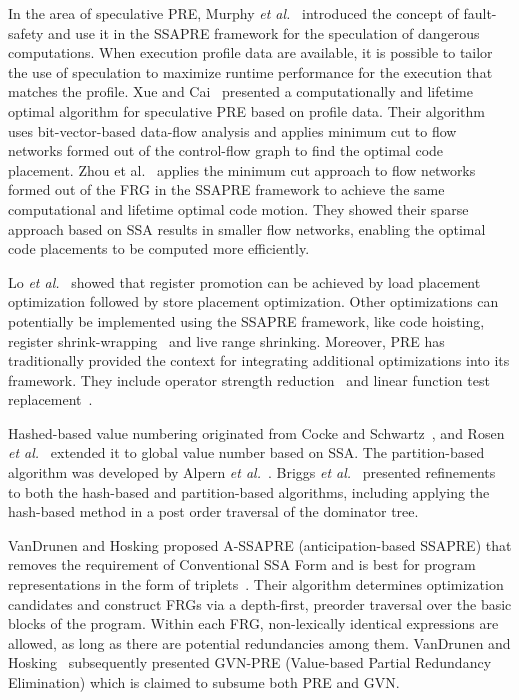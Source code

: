In the area of speculative PRE, Murphy {\it et al.}~\cite{Murphy08} introduced the concept of fault-safety and use it in the SSAPRE framework for the speculation of dangerous computations. 
When execution profile data are available, it is possible to tailor the use of speculation to maximize runtime performance for the execution that matches the profile. 
Xue and Cai~\cite{Xue06} presented a computationally and lifetime optimal algorithm for speculative PRE based on profile data. 
Their algorithm uses bit-vector-based data-flow analysis and applies minimum cut to flow networks formed out of the control-flow graph to find the optimal code placement. 
Zhou {et al.}~\cite{zhou11} applies the minimum cut approach to flow networks formed out of the FRG in the SSAPRE framework to achieve the same computational and lifetime optimal code motion. 
They showed their sparse approach based on SSA results in smaller flow networks, enabling the optimal code placements to be computed more efficiently.

Lo {\it et al.}~\cite{Lo98} showed that register promotion can be achieved by load placement optimization followed by store placement optimization. 
Other optimizations can potentially be implemented using the SSAPRE framework, like code hoisting, register shrink-wrap\-ping~\cite{Chow88} and live range shrinking. 
Moreover, PRE has traditionally provided the context for integrating additional optimizations into its framework. 
They include operator strength reduction~\cite{Knoop93} and linear function test replacement~\cite{Kennedy98}.

Hashed-based value numbering originated from Cocke and Schwartz~\cite{CS70}, and Rosen {\it et al.}~\cite{Rosen88} extended it to global value number based on SSA. 
The partition-based algorithm was developed by Alpern {\it et al.}~\cite{AWZ88}. 
Briggs {\it et al.}~\cite{Briggs97} presented refinements to both the hash-based and partition-based algorithms, including applying the hash-based method in a post order traversal of the dominator tree.

VanDrunen and Hosking proposed A-SSAPRE (anticipation-based SSAPRE) that removes the requirement of Conventional SSA Form and is best for program representations in the form of triplets~\cite{Vandrunen03}. 
Their algorithm determines optimization candidates and construct FRGs via a depth-first, preorder traversal over the basic blocks of the program. 
Within each FRG, non-lexically identical expressions are allowed, as long as there are potential redundancies among them. 
VanDrunen and Hosking~\cite{Vandrunen04} subsequently presented GVN-PRE (Value-based Partial Redundancy Elimination) which is claimed to subsume both PRE and GVN. 
